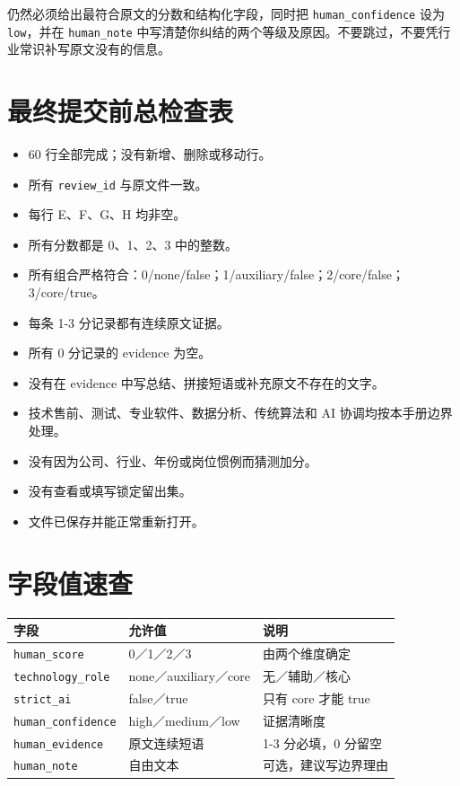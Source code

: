 \documentclass[11pt,a4paper,fontset=none]{ctexart}
\newcommand{\field}[1]{\nolinkurl{#1}}
\begin{document}
\begin{warningbox}[遇到实在无法判断的行怎么办]
仍然必须给出最符合原文的分数和结构化字段，同时把 \field{human_confidence} 设为 \texttt{low}，并在 \field{human_note} 中写清楚你纠结的两个等级及原因。不要跳过，不要凭行业常识补写原文没有的信息。
\end{warningbox}

\section{最终提交前总检查表}

\begin{itemize}[label=$\square$]
  \item 60 行全部完成；没有新增、删除或移动行。
  \item 所有 \field{review_id} 与原文件一致。
  \item 每行 E、F、G、H 均非空。
  \item 所有分数都是 0、1、2、3 中的整数。
  \item 所有组合严格符合：0/none/false；1/auxiliary/false；2/core/false；3/core/true。
  \item 每条 1-3 分记录都有连续原文证据。
  \item 所有 0 分记录的 evidence 为空。
  \item 没有在 evidence 中写总结、拼接短语或补充原文不存在的文字。
  \item 技术售前、测试、专业软件、数据分析、传统算法和 AI 协调均按本手册边界处理。
  \item 没有因为公司、行业、年份或岗位惯例而猜测加分。
  \item 没有查看或填写锁定留出集。
  \item 文件已保存并能正常重新打开。
\end{itemize}

\appendix
\section{字段值速查}

\noindent\begin{tabularx}{\textwidth}{L{3.5cm}L{3.0cm}Y}
\toprule
字段 & 允许值 & 说明\\
\midrule
\field{human_score} & 0／1／2／3 & 由两个维度确定\\
\field{technology_role} & none／auxiliary／core & 无／辅助／核心\\
\field{strict_ai} & false／true & 只有 core 才能 true\\
\field{human_confidence} & high／medium／low & 证据清晰度\\
\field{human_evidence} & 原文连续短语 & 1-3 分必填，0 分留空\\
\field{human_note} & 自由文本 & 可选，建议写边界理由\\
\bottomrule
\end{tabularx}
\end{document}
